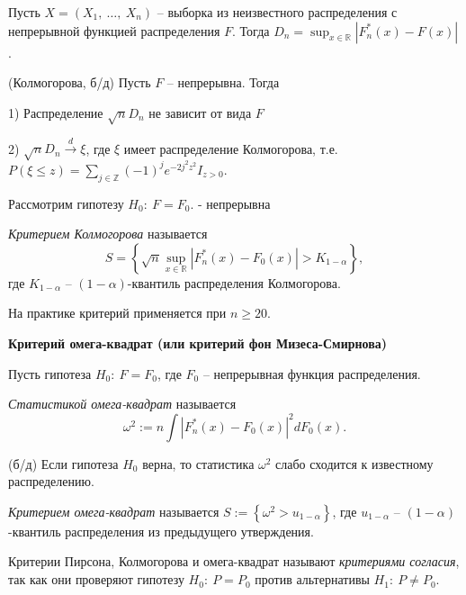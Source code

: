 Пусть $\displaystyle X=( X_{1} ,\ \dotsc ,\ X_{n})$ -- выборка из неизвестного распределения с непрерывной функцией распределения $\displaystyle F$. Тогда $\displaystyle D_{n} =\sup _{x\in \mathbb{R}}\left| F_{n}^{*}( x) -F( x)\right| $.
\begin{theorem}
    (Колмогорова, б/д) Пусть $\displaystyle F$ -- непрерывна. Тогда
    
    1) Распределение $\displaystyle \sqrt{n} D_{n}$ не зависит от вида $\displaystyle F$
    
    2) $\displaystyle \sqrt{n} D_{n}\xrightarrow{d} \xi $, где $\displaystyle \xi $ имеет распределение Колмогорова, т.е. $\displaystyle P( \xi \leqslant z) =\sum _{j\in \mathbb{Z}}( -1)^{j} e^{-2j^{2} z^{2}} I_{z >0}$.
\end{theorem}
Рассмотрим гипотезу $\displaystyle H_{0} :\ F=F_{0}$. - непрерывна
\begin{definition}
    \textit{Критерием Колмогорова} называется
    \begin{equation*}
        S=\left\{\sqrt{n}\sup _{x\in \mathbb{R}}\left| F_{n}^{*}( x) -F_{0}( x)\right|  >K_{1-\alpha }\right\} ,
    \end{equation*}
    где $\displaystyle K_{1-\alpha }$ -- $\displaystyle ( 1-\alpha )$-квантиль распределения Колмогорова.
\end{definition}
\begin{note}
    На практике критерий применяется при $\displaystyle n\geqslant 20$.
\end{note}


\textbf{Критерий омега-квадрат (или критерий фон Мизеса-Смирнова)}

Пусть гипотеза $\displaystyle H_{0} :\ F=F_{0}$, где $\displaystyle F_{0}$ -- непрерывная функция распределения.
\begin{definition}
    \textit{Статистикой омега-квадрат} называется
    \begin{equation*}
        \omega ^{2} :=n\int \left| F_{n}^{*}( x) -F_{0}( x)\right| ^{2} dF_{0}( x) .
    \end{equation*}
\end{definition}
\begin{proposition} (б/д)
    Если гипотеза $\displaystyle H_{0}$ верна, то статистика $\displaystyle \omega ^{2}$ слабо сходится к известному распределению.
\end{proposition}
\begin{definition}
    \textit{Критерием омега-квадрат} называется $\displaystyle S:=\left\{\omega ^{2}  >u_{1-\alpha }\right\}$, где $\displaystyle u_{1-\alpha }$ -- $\displaystyle ( 1-\alpha )$-квантиль распределения из предыдущего утверждения.
\end{definition}
\begin{definition}
    Критерии Пирсона, Колмогорова и омега-квадрат называют \textit{критериями согласия}, так как они проверяют гипотезу $\displaystyle H_{0} :\ P=P_{0}$ против альтернативы $\displaystyle H_{1} :\ P\neq P_{0}$.
\end{definition}